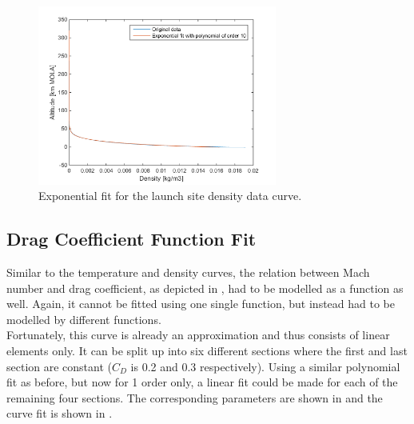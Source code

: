 \begin{figure}[H]
\centering
\includegraphics[width=0.7\textwidth]{figures/software/completeExpFitDen.png}
\caption{Exponential fit for the launch site density data curve.}
\label{fig:completeExpFitDen}
\end{figure}



\pagebreak

\subsection{Drag Coefficient Function Fit}
\label{subsec:dragCoefFuncFit}
Similar to the temperature and density curves, the relation between Mach number and drag coefficient, as depicted in , had to be modelled as a function as well. Again, it cannot be fitted using one single function, but instead had to be modelled by different functions. \\

\noindent
Fortunately, this curve is already an approximation and thus consists of linear elements only. It can be split up into six different sections where the first and last section are constant ($C_{D}$ is 0.2 and 0.3 respectively). Using a similar polynomial fit as before, but now for 1 order only, a linear fit could be made for each of the remaining four sections. The corresponding parameters are shown in  and the curve fit is shown in .


